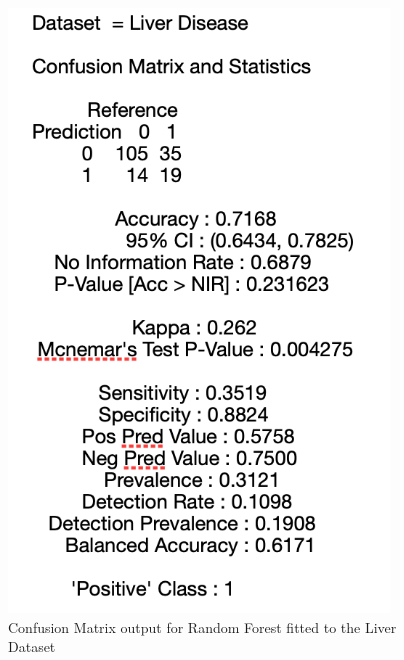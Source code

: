 \begin{figure}[!htbp]
    \centering
    \begin{minipage}{0.45\textwidth}
        \centering
        \includegraphics[width=0.9\textwidth]{ThesisTemplate/appendix/images/Chapter5Appendix/ConfusionMatrix/LiverDisease.png} 
        \caption{Confusion Matrix output for Random Forest fitted to the Liver Dataset}
        \label{fig:matrixLiver}
    \end{minipage}\hfill
    \begin{minipage}{0.45\textwidth}
        \centering

\end{minipage}
\end{figure}
